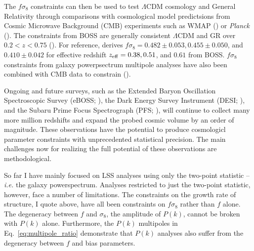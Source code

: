 The $f \sigma_8$ constraints can then be used to test $\Lambda$CDM cosmology and 
General Relativity through comparisons with cosmological model predictsions from 
Cosmic Microwave Background (CMB) experiments such as WMAP () or {\em Planck} ().
The constraints from BOSS are generally consistent $\Lambda$CDM and GR over 
$0.2 < z < 0.75$ ().  For reference,  derives 
$f\sigma_8 = 0.482 \pm 0.053, 0.455 \pm 0.050$, and $0.410 \pm 0.042$ for effective redshift 
$z_{\rm eff} = 0.38, 0.51$, and $0.61$ from BOSS. $f \sigma_8$ constraints from 
galaxy powerpsectrum multipole analyses have also been combined with CMB data to 
constrain \mneut ().

Ongoing and future surveys, such as the Extended Baryon Oscillation Spectroscopic 
Survey (eBOSS; ), the Dark Energy Survey Instrument 
(DESI; ), 
and the Subaru Prime Focus Spectrograph (PFS; ), will 
continue to collect many more million redshifts and expand the probed cosmic 
volume by an order of magnitude. These observations have the potential to 
produce cosmologicl parameter constraints with unprecedented statistical 
precision. The main challenges now for realizing the full potential of 
these observations are methodological.


So far I have mainly focused on LSS analyses using only the two-point
statistic -- \emph{i.e.} the galaxy powerspectrum. Analyses restricted
to just the two-point statistic, however, face a number of limitations. 
The constraints on the growth rate of structure, I quote above, have all 
been constraints on $f \sigma_8$ rather than $f$ alone. The degeneracy 
between $f$ and $\sigma_8$, the amplitude of $P(k)$, cannot be broken 
with $P(k)$ alone. Furthermore, the $P(k)$ multipoles in 
Eq.~\ref{eq:multipole_ratio} demonstrate that $P(k)$ analyses also 
suffer from the degeneracy between $f$ and bias parameters. 

